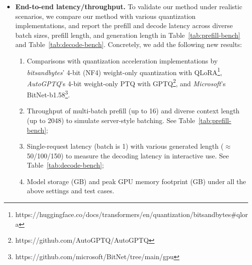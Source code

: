 \begin{revmeta}[]
\begin{itemize}
    \item \textbf{End-to-end latency/throughput.} To validate our method under realistic scenarios, we compare our method with various quantization implementations, and report the prefill and decode latency
    across diverse batch sizes, prefill length, and generation length in Table~\ref{tab:prefill-bench} and Table~\ref{tab:decode-bench}. Concretely, we add the following new results: 
    \begin{enumerate}[label={(\arabic*)}]
        \item Comparisons with quantization acceleration implementations by \textit{bitsandbytes}' 4-bit (NF4) weight-only quantization with QLoRA\footnote{https://huggingface.co/docs/transformers/en/quantization/bitsandbytes\#qlora}, \textit{AutoGPTQ}'s 4-bit weight-only PTQ with GPTQ\footnote{https://github.com/AutoGPTQ/AutoGPTQ}, and \textit{Microsoft}'s BitNet-b1.58\footnote{https://github.com/microsoft/BitNet/tree/main/gpu}. 
        \item Throughput of multi-batch prefill (up to 16) and diverse context length (up to 2048) to simulate server-style batching. See Table~\ref{tab:prefill-bench}; 
        \item Single-request latency (batch is 1) with various  generated length ($\approx$50/100/150) to measure the decoding latency in interactive use. See Table~\ref{tab:decode-bench}; 
        \item Model storage (GB) and peak GPU memory footprint (GB) under all the above settings and test cases. 
    \end{enumerate}
    
\end{itemize}


\end{revmeta}
